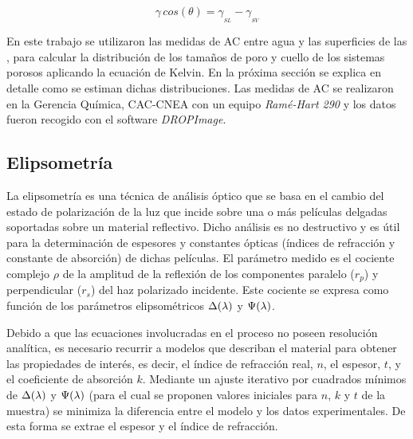 			\begin{equation}
				\gamma\, cos(\theta) = \gamma_{_{SL}} - \gamma_{_{SV}}
				\label{eq:young} 
				\end{equation}

		En este trabajo se utilizaron las medidas de AC entre agua y las superficies de las \pdm, para calcular la distribución de los tamaños de poro y cuello de los sistemas porosos aplicando la ecuación de Kelvin.\cite{Boissiere2005} En la próxima sección se explica en detalle como se estiman dichas distribuciones.
		Las medidas de AC se realizaron en la Gerencia Química, CAC-CNEA con un equipo \textit{Ramé-Hart 290} y los datos fueron recogido con el software \textit{DROPImage}.

	\subsection{Elipsometría}\label{sec:elipso}

		La elipsometría es una técnica de análisis óptico que se basa en el cambio del estado de polarización de la luz que incide sobre una o más películas delgadas soportadas sobre un material reflectivo. Dicho análisis es no destructivo y es útil para la determinación de espesores y constantes ópticas (índices de refracción y constante de absorción) de dichas películas.\cite{TompkinsHarlandG.1999,Rothen1945} El parámetro medido es el cociente complejo $\rho$ de la amplitud de la reflexión de los componentes paralelo ($r_p$) y perpendicular ($r_s$) del haz polarizado incidente. Este cociente se expresa como función de los parámetros elipsométricos $\Delta(\lambda\index{longitud de onda})$ y $\Psi(\lambda\index{longitud de onda})$. 

		Debido a que las ecuaciones involucradas en el proceso no poseen resolución analítica, es necesario recurrir a modelos que describan el material para obtener las propiedades de interés, es decir, el índice de refracción real, $n$, el espesor, $t$, y el coeficiente de absorción $k$. Mediante un ajuste iterativo por cuadrados mínimos de $\Delta(\lambda\index{longitud de onda})$ y $\Psi(\lambda\index{longitud de onda})$ (para el cual se proponen valores iniciales para $n$, $k$ y $t$ de la muestra) se minimiza la diferencia entre el modelo y los datos experimentales. De esta forma se extrae el espesor y el índice de refracción. \cite{TompkinsHarlandG.1999}

